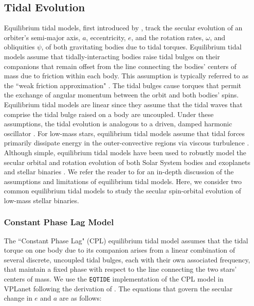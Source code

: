 \documentclass[twocolumn]{aastex61}
\newcommand{\eqtide}[0]{\texttt{EQTIDE}\xspace}
\begin{document}
\subsection{Tidal Evolution} \label{sec:methods:eqtide}

 Equilibrium tidal models, first introduced by \citep{Darwin1880}, track the secular evolution of an orbiter's semi-major axis, $a$, eccentricity, $e$, and the rotation rates, $\omega$, and obliquities $\psi$, of both gravitating bodies due to tidal torques. Equilibrium tidal models assume that tidally-interacting bodies raise tidal bulges on their companions that remain offset from the line connecting the bodies' centers of mass due to friction within each body. This assumption is typically referred to as the ``weak friction approximation" \citep{Zahn2008}.  The tidal bulges cause torques that permit the exchange of angular momentum between the orbit and both bodies' spins. Equilibrium tidal models are linear since they assume that the tidal waves that comprise the tidal bulge raised on a body are uncoupled. Under these assumptions, the tidal evolution is analogous to a driven, damped harmonic oscillator \citep{Greenberg2009}. For low-mass stars, equilibrium tidal models assume that tidal forces primarily dissipate energy in the outer-convective regions via viscous turbulence \citep[see][]{Zahn2008}. Although simple, equilibrium tidal models have been used to robustly model the secular orbital and rotation evolution of both Solar System bodies and exoplanets \citep[e.g.][]{Goldreich1966,Jackson2009,Leconte2010,Heller2011,Barnes2013,Barnes2017} and stellar binaries \citep[e.g.][]{Zahn1989,Zahn2008,Khaliullin2011,Repetto2014,Fleming2018}. We refer the reader to \citet{Barnes2017} for an in-depth discussion of the assumptions and limitations of equilibrium tidal models. Here, we consider two common equilibrium tidal models to study the secular spin-orbital evolution of low-mass stellar binaries.  

\subsubsection{Constant Phase Lag Model}

The ``Constant Phase Lag" (CPL) \citep[][]{FerrazMello2008,Heller2011} equilibrium tidal model assumes that the tidal torque on one body due to its companion arises from a linear combination of several discrete, uncoupled tidal bulges, each with their own associated frequency, that maintain a fixed phase with respect to the line connecting the two stars' centers of mass. We use the \eqtide implementation of the CPL model in VPLanet following the derivation of \citet{FerrazMello2008}.  The equations that govern the secular change in $e$ and $a$ are as follows:
\end{document}
